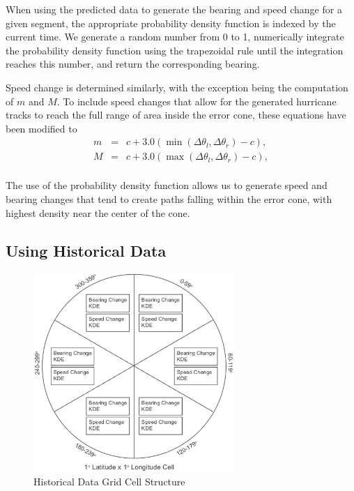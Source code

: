 \documentclass[journal]{vgtc}                %
\begin{document}
When using the predicted data to generate the bearing and speed change for a given segment, the appropriate probability density function is indexed by the current time. We generate a random number from 0 to 1, numerically integrate the probability density function using the trapezoidal rule until the integration reaches this number, and return the corresponding bearing.

Speed change is determined similarly, with the exception being the computation of $m$ and $M$.  To include speed changes that allow for the generated hurricane tracks to reach the full range of area inside the error cone, these equations have been modified to
\begin{equation}
 \begin{array}{lcl}
  m &=&  c + 3.0 (\min(\Delta \theta_{l}, \Delta \theta_{r}) - c), \\
  M &=&  c + 3.0 (\max(\Delta \theta_{l}, \Delta \theta_{r}) - c), \\
  \end{array}
 \label{eq:pre_samples_speed}
\end{equation}


The use of the probability density function allows us to generate speed and bearing changes that tend to create paths falling within the error cone, with highest density near the center of the cone.

\subsection{Using Historical Data}

\begin{figure}
 \centering
 \includegraphics[width=3.0in]{figures/DataStruct-round.eps}
 \caption{Historical Data Grid Cell Structure}
 \label{fig:ds}
\end{figure}
\end{document}
